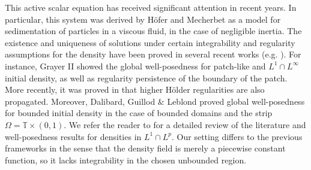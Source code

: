 \documentclass[11pt]{article}
\numberwithin{equation}{section}
\begin{document}
This active scalar equation has received significant attention in recent years. In particular, this system was derived by Höfer \cite{hofer2018sedimentation}  and Mecherbet \cite{mecherbet2019sedimentation} as a model for sedimentation of particles in a viscous fluid, in the case of negligible inertia. The existence and uniqueness of solutions under certain integrability and regularity assumptions for the density have been proved in several recent works (e.g. \cite{cobb2023wellposednessfractionalstokestransport,dalibard2025long,grayer2023dynamics,lazar2025global,leblond2022wellposedness,mecherbet2021onthesedimentation}). For instance, Grayer II \cite{grayer2023dynamics} showed the global well-posedness for patch-like and $L^1 \cap L^\infty$ initial density, as well as regularity persistence of the boundary of the patch. More recently, it was proved in \cite{lazar2025global} that higher Hölder regularities are also propagated. Moreover,  Dalibard, Guillod \& Leblond \cite{dalibard2025long} proved global well-posedness for bounded initial density in the case of bounded domains and the strip $\Omega =  \mathbb{T} \times (0,1)$. We refer the reader to \cite{mecherbet2024afewremarks} for a detailed review of the literature and well-posedness results for densities in $L^1 \cap L^p$. Our setting differs to the previous frameworks in the sense that the density field is merely a piecewise constant function, so it lacks integrability in the chosen unbounded region.

\end{document}
